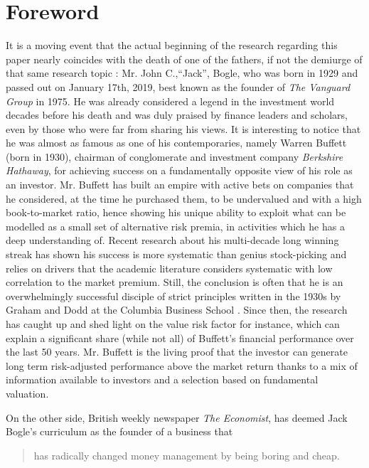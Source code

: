 \section{Foreword}
\label{Foreword}
It is a moving event that the actual beginning of the research regarding this paper nearly coincides with the death of one of the fathers, if not the demiurge of that same research topic : Mr. John C.,``Jack'', Bogle, who was born in 1929 and passed out on January 17th, 2019, best known as the founder of \textit{The Vanguard Group} in 1975. He was already considered a legend in the investment world decades before his death and was duly praised by finance leaders and scholars, even by those who were far from sharing his views. It is interesting to notice that he was almost as famous as one of his contemporaries, namely Warren Buffett (born in 1930), chairman of conglomerate and investment company \textit{Berkshire Hathaway}, for achieving success on a fundamentally opposite view of his role as an investor. Mr. Buffett has built an empire with active bets on companies that he considered, at the time he purchased them, to be undervalued and with a high book-to-market ratio, hence showing his unique ability to exploit what can be modelled as a small set of alternative risk premia, in activities which he has a deep understanding of. Recent research about his multi-decade long winning streak has shown his success is more systematic than genius stock-picking and relies on drivers that the academic literature considers systematic with low correlation to the market premium. Still, the conclusion is often that he is an overwhelmingly successful disciple of strict principles written in the 1930s by Graham and Dodd at the Columbia Business School \parencite{Graham1962}. Since then, the research has caught up and shed light on the value risk factor for instance, which can explain a significant share (while not all) of Buffett's financial performance over the last 50 years. Mr. Buffett is the living proof that the investor can generate long term risk-adjusted performance above the market return thanks to a mix of information available to investors and a selection based on fundamental valuation. 

On the other side, British weekly newspaper \textit{The Economist}, has deemed Jack Bogle's curriculum as the founder of a business that
\begin{quotation}
has radically changed money management by being boring and cheap.
\end{quotation}

